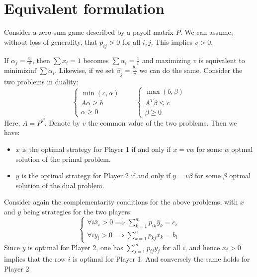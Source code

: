 \section{Equivalent formulation}

Consider a zero sum game described by a payoff matrix $P$. 
We can assume, without loss of generality, that $p_{ij}>0$ for all $i,j$.
This implies $v>0$.

If $\alpha_j=\frac{x_i}{v}$, then $\sum x_i=1$ becomes $\sum \alpha_i=\frac{1}{v}$ and maximizing $v$ is equivalent to minimizinf $\sum\alpha_i$.
Likewise, if we set $\beta_j=\frac{y_j}{v}$ we can do the same. 
Consider the two problems in duality: 
\[\begin{cases}
    \min (c,\alpha) \\
    A\alpha\geq b \\
    \alpha\geq 0
\end{cases} \qquad \begin{cases}
    \max (b,\beta) \\
    A^T\beta\leq c \\
    \beta\geq 0
\end{cases}\]
Here, $A=P^T$. 
Denote by $v$ the common value of the two problems.
Then we have: 
\begin{itemize}
    \item $x$ is the optimal strategy for Player 1 if and only if $x=v\alpha$ for some $\alpha$ optmal solution of the primal problem.
    \item $y$ is the optimal strategy for Player 2 if and only if $y=v\beta$ for some $\beta$ optmal solution of the dual problem.
\end{itemize}

Consider again the complementarity conditions for the above problems, with $x$ and $y$ being strategies for the two players: 
\[\begin{cases}
    \forall i \bar{x}_i>0 \implies\sum_{k=1}^mp_{ik}\bar{y}_k=c_i \\
    \forall i \bar{y}_i>0 \implies\sum_{k=1}^np_{kj}\bar{x}_k=b_i 
\end{cases}\]
Since $\bar{y}$ is optimal for Player 2, one has $\sum_{j=1}^mp_{ij}\bar{y}_j$ for all $i$, and hence $x_i>0$ implies that the row $i$ is optimal for Player 1.
And conversely the same holds for Player 2